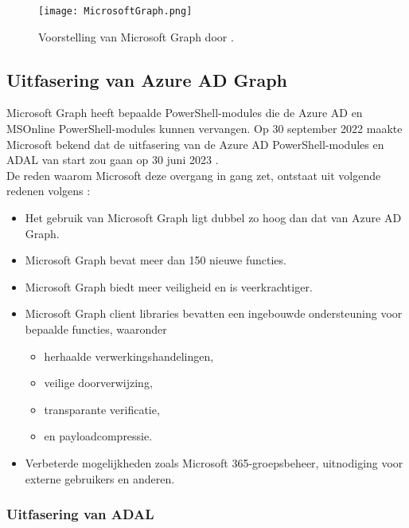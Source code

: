 \begin{figure}[h]
    \texttt{[image: MicrosoftGraph.png]}
    \caption[Voorbeeld Microsoft Graph]{Voorstelling van Microsoft Graph door \textcite{Microsoft2023d}.}
    \label{msg}
\end{figure}

\subsection{Uitfasering van Azure AD Graph}
 
Microsoft Graph heeft bepaalde PowerShell-modules die de Azure \ac{AD} en MSOnline PowerShell-modules kunnen vervangen. Op 30 september 2022 maakte Microsoft bekend dat de uitfasering van de Azure \ac{AD} PowerShell-modules en \ac{ADAL} van start zou gaan op 30 juni 2023 \autocite{Sahay2022}. \\

De reden waarom Microsoft deze overgang in gang zet, ontstaat uit volgende redenen volgens \textcite{Microsoft2023e}:

\begin{itemize}
    \item Het gebruik van Microsoft Graph ligt dubbel zo hoog dan dat van Azure \ac{AD} Graph.
    \item Microsoft Graph bevat meer dan 150 nieuwe functies.
    \item Microsoft Graph biedt meer veiligheid en is veerkrachtiger.
    \item Microsoft Graph client libraries bevatten een ingebouwde ondersteuning voor bepaalde functies, waaronder
    \begin{itemize}
        \item herhaalde verwerkingshandelingen,
        \item veilige doorverwijzing,
        \item transparante verificatie,
        \item en payloadcompressie.
    \end{itemize}
    \item Verbeterde mogelijkheden zoals Microsoft 365-groepsbeheer, uitnodiging voor externe gebruikers en anderen.
\end{itemize} 

\subsubsection{Uitfasering van ADAL}

